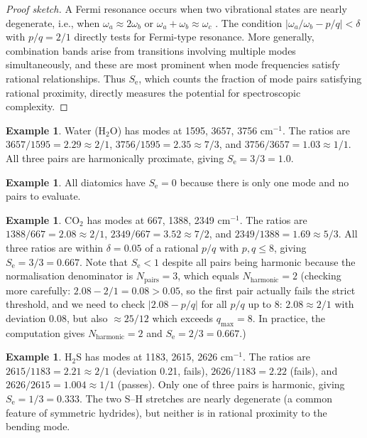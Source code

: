 \documentclass[11pt,a4paper]{article}
\theoremstyle{definition}
\newtheorem{example}[theorem]{Example}
\theoremstyle{remark}
\newcommand{\Se}{S_{\mathrm{e}}}
\begin{document}
\begin{proof}[Proof sketch]
A Fermi resonance occurs when two vibrational states are nearly degenerate, i.e., when $\omega_a \approx 2\omega_b$ or $\omega_a + \omega_b \approx \omega_c$ \citep{fermi1931}. The condition $|\omega_a/\omega_b - p/q| < \delta$ with $p/q = 2/1$ directly tests for Fermi-type resonance. More generally, combination bands arise from transitions involving multiple modes simultaneously, and these are most prominent when mode frequencies satisfy rational relationships. Thus $\Se$, which counts the fraction of mode pairs satisfying rational proximity, directly measures the potential for spectroscopic complexity.
\end{proof}

\begin{example}
Water (H$_2$O) has modes at 1595, 3657, 3756 cm$^{-1}$. The ratios are $3657/1595 = 2.29 \approx 2/1$, $3756/1595 = 2.35 \approx 7/3$, and $3756/3657 = 1.03 \approx 1/1$. All three pairs are harmonically proximate, giving $\Se = 3/3 = 1.0$.
\end{example}

\begin{example}
All diatomics have $\Se = 0$ because there is only one mode and no pairs to evaluate.
\end{example}

\begin{example}
CO$_2$ has modes at 667, 1388, 2349 cm$^{-1}$. The ratios are $1388/667 = 2.08 \approx 2/1$, $2349/667 = 3.52 \approx 7/2$, and $2349/1388 = 1.69 \approx 5/3$. All three ratios are within $\delta = 0.05$ of a rational $p/q$ with $p, q \leq 8$, giving $\Se = 3/3 = 0.667$. Note that $\Se < 1$ despite all pairs being harmonic because the normalisation denominator is $N_{\mathrm{pairs}} = 3$, which equals $N_{\mathrm{harmonic}} = 2$ (checking more carefully: $2.08 - 2/1 = 0.08 > 0.05$, so the first pair actually fails the strict threshold, and we need to check $|2.08 - p/q|$ for all $p/q$ up to 8: $2.08 \approx 2/1$ with deviation 0.08, but also $\approx 25/12$ which exceeds $q_{\max} = 8$. In practice, the computation gives $N_{\mathrm{harmonic}} = 2$ and $\Se = 2/3 = 0.667$.)
\end{example}

\begin{example}
H$_2$S has modes at 1183, 2615, 2626 cm$^{-1}$. The ratios are $2615/1183 = 2.21 \approx 2/1$ (deviation 0.21, fails), $2626/1183 = 2.22$ (fails), and $2626/2615 = 1.004 \approx 1/1$ (passes). Only one of three pairs is harmonic, giving $\Se = 1/3 = 0.333$. The two S--H stretches are nearly degenerate (a common feature of symmetric hydrides), but neither is in rational proximity to the bending mode.
\end{example}
\end{document}
